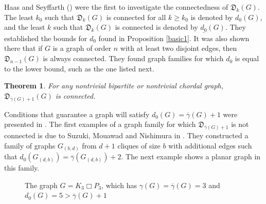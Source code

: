 \documentclass{article}
\numberwithin{figure}{section}
\numberwithin{table}{section}
\numberwithin{equation}{section}
\newtheorem{thm}{Theorem}[section]
\theoremstyle{definition}
\theoremstyle{definition}
\theoremstyle{definition}
\newcommand{\ol}{\overline}
\newcommand{\dbar}{\ol\gamma}
\newcommand{\dtar}{\mathfrak{D}}%
\newcommand{\ddo}{d_0}
\newcommand{\uldo}{\underline{d_0}}
\begin{document}
{ Haas and Seyffarth (\cite{HS14}) were the first to investigate the connectedness of $\dtar_k(G)$.  The least $k_0$ such that $\dtar_k(G)$ is connected for all $k\ge k_0$ is denoted by $\ddo(G)$,  and the least $k$ such that $\dtar_k(G)$ is connected is denoted by $\uldo(G)$. 
 They established the bounds for $\ddo$ found in Proposition \ref{basic1}. It was also shown there that if $G$ is a graph of order $n$ with at least two disjoint edges, then $\dtar_{n-1}(G)$ is always connected. They  found graph families for which $\ddo$ is equal to the lower bound, such as the one listed next.  

\begin{thm}\label{dbarplus1}{\rm\cite{HS14}} For any nontrivial bipartite or nontrivial chordal graph, $\dtar_{\dbar(G)+1}(G)$ is connected. 
\end{thm}

Conditions that guarantee a graph will satisfy $\ddo(G)=\dbar(G)+1$  were presented in \cite{HS17}.
The first examples of a graph family for which $\dtar_{\dbar(G)+1}$ is not connected is due to Suzuki, Mouawad and Nishimura in \cite{SMN14}. They constructed a family of graphs $G_{(b,d)}$ from $d+1$ cliques of size $b$ with additional edges such that $\ddo(G_{(d,b)})=\dbar(G_{(d,b)})+2$. The next example shows a planar graph in this family.

\begin{figure}[!h]
\centering
{}
\caption{ The graph $G=K_3\Box P_3$, which has $\gamma(G)=\dbar(G)=3$ and  $\ddo(G)=5>\dbar(G)+1$ \label{f:K3boxP3}}\vspace{-10pt}
\end{figure}

}
\end{document}
